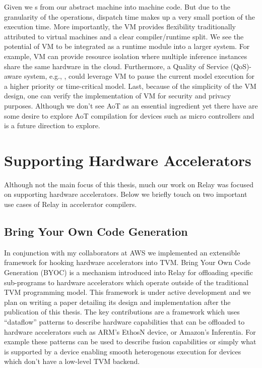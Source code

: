 Given we s from our abstract machine into machine code.
But due to the granularity of the operations, dispatch time makes
  up a very small portion of the execution time.
More importantly, the VM provides flexibility traditionally attributed
  to virtual machines and a clear compiler/runtime split.
We see the potential of VM to be integrated as a runtime module into a larger system.
For example, VM can provide resource isolation where multiple inference
  instances share the same hardware in the cloud.
Furthermore, a Quality of Service (QoS)-aware system, e.g., \citep{kang2018hotmobile, Yachir2009rsj},
  could leverage VM to pause the current model execution for a higher priority or time-critical model.
Last, because of the simplicity of the VM design, one can verify the implementation of VM for security and privacy purposes.
Although we don't see AoT as an essential ingredient yet there have are some desire to explore AoT
  compilation for devices such as micro controllers and is a future direction to explore.



\section{Supporting Hardware Accelerators}
\label{sec:accel}

Although not the main focus of this thesis, much our
  work on Relay was focused on supporting hardware accelerators.
Below we briefly touch on two important use cases of Relay in
  accelerator compilers.

\subsection{Bring Your Own Code Generation}
\label{sec:byoc}

In conjunction with my collaborators at AWS we implemented an
  extensible framework for hooking hardware accelerators into
  TVM.
Bring Your Own Code Generation (BYOC) is a mechanism introduced
  into Relay for offloading specific sub-programs to hardware
  accelerators which operate outside of the traditional TVM
  programming model.
This framework is under active development and we plan
  on writing a paper detailing its design and implementation
  after the publication of this thesis.
The key contributions are a framework which uses ``dataflow''
  patterns to describe hardware capabilities that can be
  offloaded to hardware accelerators such as ARM's EthosN
  device, or Amazon's Inferentia.
For example these patterns can be used to describe fusion
  capabilities or simply what is supported by a device
  enabling smooth heterogenous execution for devices
  which don't have a low-level TVM backend.

